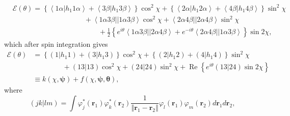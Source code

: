 \documentclass[aps,preprint]{revtex4}%
\begin{document}
\begin{align}
&  \mathcal{E}\left(  \theta\right)  =\left\{  \left\langle 1\alpha\left\vert
h_{1}1\alpha\right.  \right\rangle +\left\langle 3\beta\left\vert h_{1}%
3\beta\right.  \right\rangle \right\}  \cos^{2}\chi+\left\{  \left\langle
2\alpha\left\vert h_{1}2\alpha\right.  \right\rangle +\left\langle
4\beta\left\vert h_{1}4\beta\right.  \right\rangle \right\}  \sin^{2}%
\chi\nonumber\\
&  \qquad\qquad\qquad\qquad\qquad+\left\langle 1\alpha3\beta\right\vert
\left\vert 1\alpha3\beta\right\rangle \cos^{2}\chi+\left\langle 2\alpha
4\beta\right\vert \left\vert 2\alpha4\beta\right\rangle \sin^{2}%
\chi\nonumber\\
&  \qquad\qquad\qquad\qquad\qquad\qquad+\frac{1}{2}\left\{  e^{i\theta
}\left\langle 1\alpha3\beta\right\vert \left\vert 2\alpha4\beta\right\rangle
+e^{-i\theta}\left\langle 2\alpha4\beta\right\vert \left\vert 1\alpha
3\beta\right\rangle \right\}  \sin2\chi,
\end{align}
which after spin integration gives
\begin{align}
\mathcal{E}\left(  \theta\right)   &  =\left\{  \left(  1\left\vert
h_{1}1\right.  \right)  +\left(  3\left\vert h_{1}3\right.  \right)  \right\}
\cos^{2}\chi+\left\{  \left(  2\left\vert h_{1}2\right.  \right)  +\left(
4\left\vert h_{1}4\right.  \right)  \right\}  \sin^{2}\chi\nonumber\\
&  \qquad\qquad\,+\left(  \left.  13\right\vert 13\right)  \cos^{2}%
\chi+\left(  \left.  24\right\vert 24\right)  \sin^{2}\chi+\operatorname{Re}%
\left\{  e^{i\theta}\left(  \left.  13\right\vert 24\right)  \sin
2\chi\right\}  \nonumber\\
&  \equiv k\left(  \chi,\boldsymbol{\psi}\right)  +f\left(  \chi
,\boldsymbol{\psi,\theta}\right)  ,
\end{align}
where
\begin{equation}
\left(  \left.  jk\right\vert lm\right)  =\int\varphi_{j}^{\ast}\left(
\boldsymbol{r}_{1}\right)  \varphi_{k}^{\ast}\left(  \boldsymbol{r}%
_{2}\right)  \frac{1}{\left\Vert \boldsymbol{r}_{1}-\boldsymbol{r}%
_{2}\right\Vert }\varphi_{l}\left(  \boldsymbol{r}_{1}\right)  \varphi
_{m}\left(  \boldsymbol{r}_{2}\right)  d\boldsymbol{r}_{1}d\boldsymbol{r}_{2},
\end{equation}
%
\end{document}
